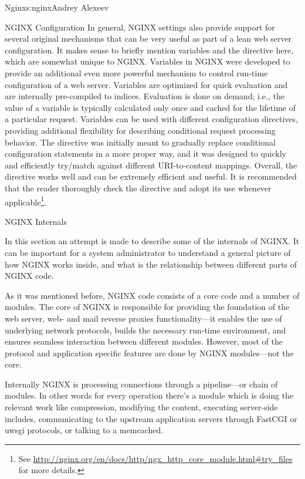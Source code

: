 \begin{aosachapter}{Nginx}{s:nginx}{Andrey Alexeev}
\begin{aosasect1}{NGINX Configuration}
In general, NGINX settings also provide support for several original
mechanisms that can be very useful as part of a lean web server
configuration. It makes sense to briefly mention variables and the
 directive here, which are somewhat unique to
NGINX. Variables in NGINX were developed to provide an additional even
more powerful mechanism to control run-time configuration of a web
server. Variables are optimized for quick evaluation and are
internally pre-compiled to indices. Evaluation is done on demand;
i.e., the value of a variable is typically calculated only once and
cached for the lifetime of a particular request. Variables can be used
with different configuration directives, providing additional
flexibility for describing conditional request processing
behavior. The  directive was initially meant to
gradually replace conditional  configuration statements in a
more proper way, and it was designed to quickly and efficiently
try/match against different URI-to-content mappings. Overall, the
 directive works well and can be extremely efficient
and useful. It is recommended that the reader thoroughly check the
 directive and adopt its use whenever
applicable\footnote{See
  \url{http://nginx.org/en/docs/http/ngx\_http\_core\_module.html#try\_files}
  for more details.}.

\end{aosasect1}


\begin{aosasect1}{NGINX Internals}

In this section an attempt is made to describe some of the internals
of NGINX. It can be important for a system administrator to understand
a general picture of how NGINX works inside, and what is the
relationship between different parts of NGINX code.

As it was mentioned before, NGINX code consists of a core code and a
number of modules. The core of NGINX is responsible for providing the
foundation of the web server, web- and mail reverse proxies
functionality---it enables the use of underlying network protocols,
builds the necessary run-time environment, and ensures seamless
interaction between different modules. However, most of the protocol
and application specific features are done by NGINX modules---not the
core.

Internally NGINX is processing connections through a pipeline---or
chain of modules. In other words for every operation there's a module
which is doing the relevant work like compression, modifying the
content, executing server-side includes, communicating to the upstream
application servers through FastCGI or uwsgi protocols, or talking to
a memcached.


\end{aosasect1}
\end{aosachapter}
